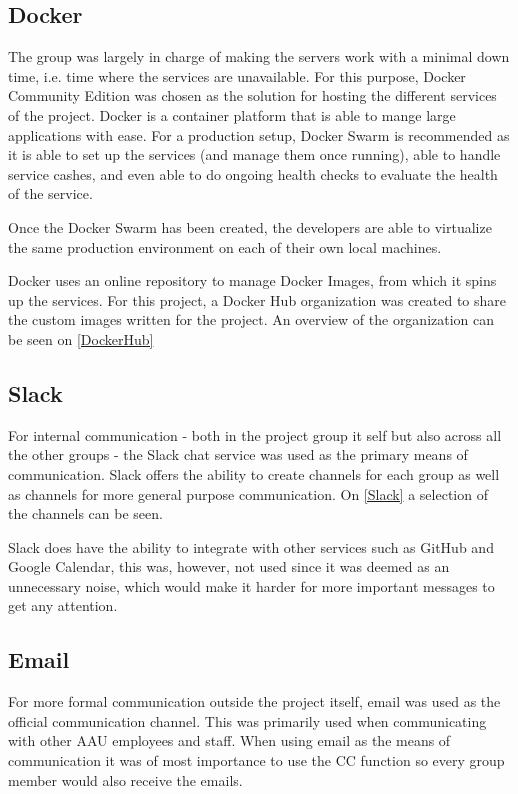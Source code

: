 

\subsection{Docker}
The group was largely in charge of making the servers work with a minimal down time, i.e. time where the services are unavailable.
For this purpose, Docker Community Edition was chosen as the solution for hosting the different services of the project.
Docker is a container platform that is able to mange large applications with ease.
For a production setup, Docker Swarm is recommended as it is able to set up the services (and manage them once running), able to handle service cashes, and even able to do ongoing health checks to evaluate the health of the service.

Once the Docker Swarm has been created, the developers are able to virtualize the same production environment on each of their own local machines.

Docker uses an online repository to manage Docker Images, from which it spins up the services.
For this project, a Docker Hub organization was created to share the custom images written for the project.
An overview of the organization can be seen on \autoref{DockerHub}


\subsection{Slack}
For internal communication - both in the project group it self but also across all the other groups - the Slack chat service was used as the primary means of communication.
Slack offers the ability to create channels for each group as well as channels for more general purpose communication.
On \autoref{Slack} a selection of the channels can be seen.


Slack does have the ability to integrate with other services such as GitHub and Google Calendar, this was, however, not used since it was deemed as an unnecessary noise, which would make it harder for more important messages to get any attention.

\subsection{Email}
For more formal communication outside the project itself, email was used as the official communication channel. 
This was primarily used when communicating with other AAU employees and staff.
When using email as the means of communication it was of most importance to use the CC function so every group member would also receive the emails.
